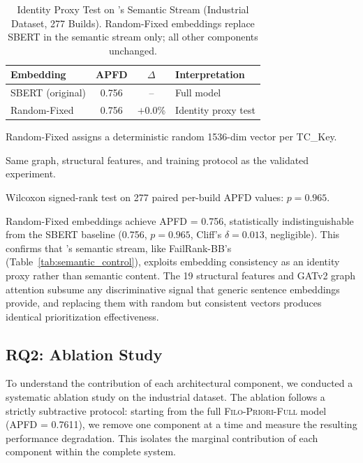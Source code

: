 \begin{table}[!t]
\centering
\caption{Identity Proxy Test on \filopriori{}'s Semantic Stream (Industrial
Dataset, 277 Builds). Random-Fixed embeddings replace SBERT in the semantic
stream only; all other components unchanged.}
\label{tab:filopriori_randomfixed}
\footnotesize
\begin{tabular}{lccl}
\toprule
\textbf{Embedding} & \textbf{APFD} & \textbf{$\Delta$} & \textbf{Interpretation} \\
\midrule
SBERT (original) & 0.756 & -- & Full model \\
Random-Fixed & 0.756 & $+$0.0\% & Identity proxy test \\
\bottomrule
\end{tabular}
\begin{tablenotes}
\small
\item Random-Fixed assigns a deterministic random 1536-dim vector per TC\_Key.
\item Same graph, structural features, and training protocol as the validated experiment.
\item Wilcoxon signed-rank test on 277 paired per-build APFD values: $p = 0.965$.
\end{tablenotes}
\end{table}

Random-Fixed embeddings achieve APFD = 0.756, statistically
indistinguishable from the SBERT baseline (0.756, $p = 0.965$, Cliff's
$\delta = 0.013$, negligible). This confirms that \filopriori{}'s semantic
stream, like FailRank-BB's (Table~\ref{tab:semantic_control}), exploits
embedding consistency as an identity proxy rather than semantic content.
The 19 structural features and GATv2 graph attention subsume any
discriminative signal that generic sentence embeddings provide, and
replacing them with random but consistent vectors produces identical
prioritization effectiveness.


\subsection{RQ2: Ablation Study}
\label{sec:rq2}

To understand the contribution of each architectural component, we conducted
a systematic ablation study on the industrial dataset. The ablation follows
a strictly subtractive protocol: starting from the full
\textsc{Filo-Priori-Full} model (APFD = 0.7611), we remove one component at
a time and measure the resulting performance degradation. This isolates the
marginal contribution of each component within the complete system.

